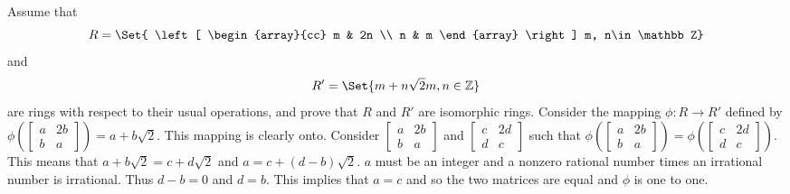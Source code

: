 \documentclass[paper=a4, fontsize=11pt]{jhwhw} %
\providecommand\given{} %
\begin{document}
Assume that
$$
R = \Set{
\left[ \begin{array}{cc}
m & 2n \\
n & m \end{array} \right]
\given m, n\in \mathbb Z}
$$
and
$$
R' = \Set{m + n\sqrt{2}\given m,n \in \mathbb Z}
$$
are rings with respect to their usual operations, and prove that $R$ and $R'$ are isomorphic rings.
\solution
Consider the mapping $\phi: R\to R'$ defined by $\phi\left(
    \left[ \begin{array}{cc}
    a & 2b \\
    b & a \end{array} \right]\right)
     = a + b\sqrt{2}$. 
This mapping is clearly onto. Consider 
$
    \left[ \begin{array}{cc}
    a & 2b \\
    b & a \end{array} \right]
$
and 
$
    \left[ \begin{array}{cc}
    c & 2d \\
    d & c \end{array} \right]
$
such that 
$
\phi\left(\left[ \begin{array}{cc}
    a & 2b \\
b & a \end{array} \right]\right)
            =
\phi\left(\left[ \begin{array}{cc}
    c & 2d \\
d & c \end{array} \right]\right)
            $. This means that $a + b\sqrt{2} = c + d\sqrt{2}$ and $a = c + (d-b)\sqrt{2}$. $a$ must be an integer and a nonzero rational number times an irrational number is irrational. Thus $d-b = 0$ and $d = b$. This implies that $a = c$ and so the two matrices are equal and $\phi$ is one to one.
\end{document}
